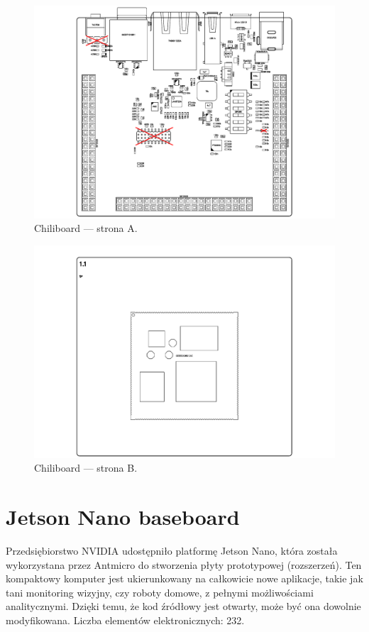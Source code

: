 \begin{figure}[H]
	\centering
	\includegraphics[width=0.8\linewidth,clip, trim=3cm 0.2cm 3cm 0.1cm]{./chapters/chapter5/chilli_A.pdf}
	\caption{Chiliboard --- strona A.}\label{chilli:StronaA}
\end{figure}


\begin{figure}[H]
	\centering
	\includegraphics[width=0.8\linewidth,clip, trim=3cm 0.1cm 3cm 0.1cm]{./chapters/chapter5/chilli_B.pdf}
	\caption{Chiliboard --- strona B.}\label{chilli:StronaB}
\end{figure}


\section{Jetson Nano baseboard}
Przedsiębiorstwo NVIDIA udostępniło platformę Jetson Nano, która została wykorzystana przez Antmicro do stworzenia płyty prototypowej (rozszerzeń).
Ten kompaktowy komputer jest ukierunkowany na całkowicie nowe aplikacje, takie jak tani monitoring wizyjny, czy roboty domowe, z pełnymi możliwościami analitycznymi.
Dzięki temu, że kod źródłowy jest otwarty, może być ona dowolnie modyfikowana.
Liczba elementów elektronicznych: 232.

